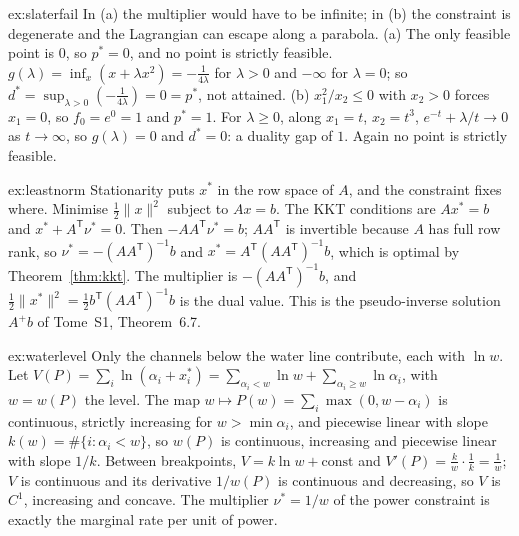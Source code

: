 \begin{solution}{ex:slaterfail}
\idea In (a) the multiplier would have to be infinite; in (b) the constraint is degenerate and the Lagrangian can escape along a parabola.
\writeup (a) The only feasible point is $0$, so $p^*=0$, and no point is strictly feasible. $g(\lambda)=\inf_x(x+\lambda x^2)=-\frac1{4\lambda}$ for $\lambda>0$ and $-\infty$ for $\lambda=0$; so
$d^*=\sup_{\lambda>0}(-\frac1{4\lambda})=0=p^*$, not attained. (b) $x_1^2/x_2\le0$ with $x_2>0$ forces $x_1=0$, so $f_0=e^0=1$ and $p^*=1$. For $\lambda\ge0$, along $x_1=t$, $x_2=t^3$,
$e^{-t}+\lambda/t\to0$ as $t\to\infty$, so $g(\lambda)=0$ and $d^*=0$: a duality gap of $1$. Again no point is strictly feasible.
\end{solution}

\begin{solution}{ex:leastnorm}
\idea Stationarity puts $x^*$ in the row space of $A$, and the constraint fixes where.
\writeup Minimise $\frac12\|x\|^2$ subject to $Ax=b$. The KKT conditions are $Ax^*=b$ and $x^*+A^{\mathsf T}\nu^*=0$. Then $-AA^{\mathsf T}\nu^*=b$; $AA^{\mathsf T}$ is invertible because $A$ has full row
rank, so $\nu^*=-(AA^{\mathsf T})^{-1}b$ and $x^*=A^{\mathsf T}(AA^{\mathsf T})^{-1}b$, which is optimal by Theorem~\ref{thm:kkt}. The multiplier is $-(AA^{\mathsf T})^{-1}b$, and $\frac12\|x^*\|^2=\frac12b^{\mathsf T}(AA^{\mathsf T})^{-1}b$
is the dual value. This is the pseudo-inverse solution $A^+b$ of Tome~S1, Theorem~6.7.
\end{solution}

\begin{solution}{ex:waterlevel}
\idea Only the channels below the water line contribute, each with $\ln w$.
\writeup Let $V(P)=\sum_i\ln(\alpha_i+x_i^*)=\sum_{\alpha_i<w}\ln w+\sum_{\alpha_i\ge w}\ln\alpha_i$, with $w=w(P)$ the level. The map $w\mapsto P(w)=\sum_i\max(0,w-\alpha_i)$ is continuous, strictly
increasing for $w>\min\alpha_i$, and piecewise linear with slope $k(w)=\#\{i:\alpha_i<w\}$, so $w(P)$ is continuous, increasing and piecewise linear with slope $1/k$. Between breakpoints,
$V=k\ln w+\text{const}$ and $V'(P)=\frac kw\cdot\frac1k=\frac1w$; $V$ is continuous and its derivative $1/w(P)$ is continuous and decreasing, so $V$ is $C^1$, increasing and concave. The multiplier
$\nu^*=1/w$ of the power constraint is exactly the marginal rate per unit of power.
\end{solution}


